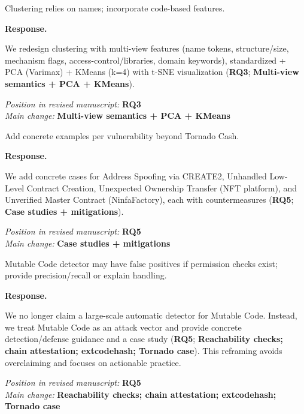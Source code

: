 \documentclass[acmsmall]{acmart}
\begin{document}
	\begin{tcolorbox}
		[commentbox,title=Reviewer \#2 -- Comment 3] Clustering relies on names; incorporate code-based
		features.
	\end{tcolorbox}

	\noindent
	\textbf{Response.}

	We redesign clustering with multi-view features (name tokens, structure/size, mechanism flags,
	access-control/libraries, domain keywords), standardized + PCA (Varimax) + KMeans (k=4) with t-SNE
	visualization ({\textbf{RQ3}}; {\textbf{Multi-view semantics + PCA + KMeans}}).

	\textit{Position in revised manuscript:} {\color{red}\textbf{RQ3}}\\ \textit{Main change:} {\color{blue}\textbf{Multi-view semantics + PCA + KMeans}}

	\begin{tcolorbox}
		[commentbox,title=Reviewer \#2 -- Comment 4] Add concrete examples per vulnerability beyond Tornado
		Cash.
	\end{tcolorbox}

	\noindent
	\textbf{Response.}

	We add concrete cases for Address Spoofing via CREATE2, Unhandled Low-Level Contract Creation, Unexpected
	Ownership Transfer (NFT platform), and Unverified Master Contract (NinfaFactory), each with countermeasures
	({\textbf{RQ5}}; {\textbf{Case studies + mitigations}}).

	\textit{Position in revised manuscript:} {\color{red}\textbf{RQ5}}\\ \textit{Main change:} {\color{blue}\textbf{Case studies + mitigations}}

	\begin{tcolorbox}
		[commentbox,title=Reviewer \#2 -- Comment 5] Mutable Code detector may have false positives if
		permission checks exist; provide precision/recall or explain handling.
	\end{tcolorbox}

	\noindent
	\textbf{Response.}

	We no longer claim a large-scale automatic detector for Mutable Code. Instead, we treat Mutable Code
	as an attack vector and provide concrete detection/defense guidance and a case study ({\textbf{RQ5}};
	{\textbf{Reachability checks; chain attestation; extcodehash; Tornado case}}). This reframing avoids
	overclaiming and focuses on actionable practice.

	\textit{Position in revised manuscript:} {\color{red}\textbf{RQ5}}\\ \textit{Main change:}
	{\color{blue}\textbf{Reachability checks; chain attestation; extcodehash; Tornado case}}
\end{document}
